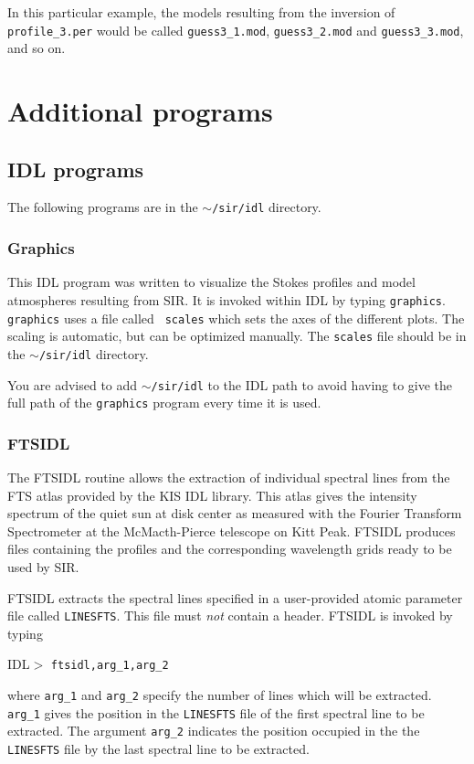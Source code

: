 \documentclass[11pt]{report}
\begin{document}
In this particular example, the models resulting from the inversion
of {\tt profile\_3.per} would be called {\tt guess3\_1.mod}, 
{\tt guess3\_2.mod} and {\tt guess3\_3.mod}, and so on. 


\chapter{Additional programs}

\section{IDL programs}
The following programs are in the {\tt $\sim$/sir/idl} directory.

\subsection{Graphics}
This IDL program was written to visualize the Stokes profiles and
model atmospheres resulting from SIR. It is invoked within IDL 
by typing {\tt graphics}. {\tt graphics} uses a file called {\tt 
scales} which sets the axes of the different plots. The scaling 
is automatic, but can be optimized manually. The {\tt scales} 
file should be in the {\tt $\sim$/sir/idl} directory. 

You are advised to add {\tt $\sim$/sir/idl} to the IDL path to 
avoid having to give the full path of the {\tt graphics} program 
every time it is used.

\subsection{FTSIDL}
The FTSIDL routine allows the extraction of individual spectral lines from
the FTS atlas provided by the KIS IDL library. This atlas gives the intensity 
spectrum of the quiet sun at disk center as measured with the Fourier 
Transform Spectrometer at the McMacth-Pierce telescope on Kitt Peak. 
FTSIDL produces files containing the profiles and the corresponding 
wavelength grids ready to be used by SIR.

FTSIDL extracts the spectral lines specified in a user-provided atomic parameter
file called {\tt LINESFTS}. This file must {\em not} contain a header. 
FTSIDL is invoked by typing
\begin{flushleft}
IDL$>$ {\tt ftsidl,arg\_1,arg\_2 }
\end{flushleft}
where {\tt arg\_1} and {\tt arg\_2} specify the number of lines which
will be extracted. {\tt arg\_1} gives the position in the {\tt LINESFTS} 
file of the first spectral line to be extracted. The argument
{\tt arg\_2} indicates the position occupied in the
the {\tt LINESFTS} file by the last spectral line to be extracted. 
\end{document}
